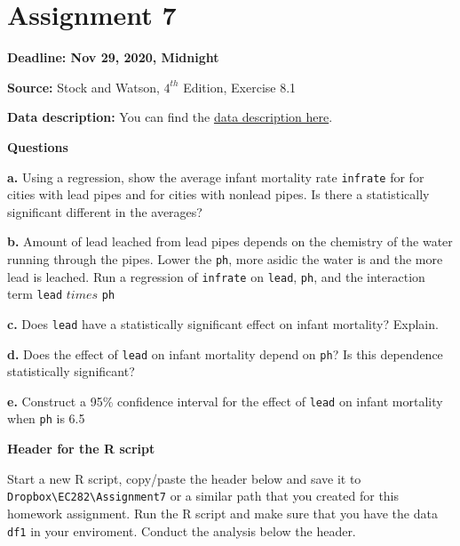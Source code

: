 \documentclass[
]{book}
\begin{document}
\hypertarget{assignment-7}{%
\section{Assignment 7}\label{assignment-7}}

\textbf{Deadline: Nov 29, 2020, Midnight}

\textbf{Source:} Stock and Watson, \(4^{th}\) Edition, Exercise 8.1

\textbf{Data description:} You can find the \href{https://www.dropbox.com/s/xdensdqj97bf2cj/Lead_Mortality_Description.pdf?dl=1}{data description here}.

\textbf{Questions}

\textbf{a.} Using a regression, show the average infant mortality rate \texttt{infrate} for for cities with lead pipes and for cities with nonlead pipes. Is there a statistically significant different in the averages?

\textbf{b.} Amount of lead leached from lead pipes depends on the chemistry of the water running through the pipes. Lower the \texttt{ph}, more asidic the water is and the more lead is leached. Run a regression of \texttt{infrate} on \texttt{lead}, \texttt{ph}, and the interaction term \texttt{lead} \(times\) \texttt{ph}

\textbf{c.} Does \texttt{lead} have a statistically significant effect on infant mortality? Explain.

\textbf{d.} Does the effect of \texttt{lead} on infant mortality depend on \texttt{ph}? Is this dependence statistically significant?

\textbf{e.} Construct a 95\% confidence interval for the effect of \texttt{lead} on infant mortality when \texttt{ph} is 6.5

\textbf{Header for the R script}

Start a new R script, copy/paste the header below and save it to \texttt{Dropbox\textbackslash{}EC282\textbackslash{}Assignment7} or a similar path that you created for this homework assignment. Run the R script and make sure that you have the data \texttt{df1} in your enviroment. Conduct the analysis below the header.
\end{document}
